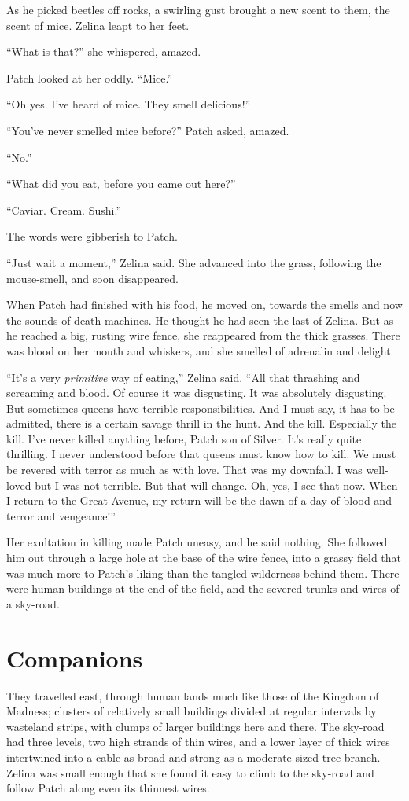 \documentclass[ebook,oneside,openany,17pt]{memoir}
\renewcommand{\thechapter}{\Roman{chapter}}
\newcounter{sections}
\newcommand{\sections}[1]{%
  \section*{#1}
  \addtocounter{sections}{1}%
  \pdfbookmark[1]{#1}{section.\thechapter.\thesections}}
\begin{document}
As he picked beetles off rocks, a swirling gust brought a new scent to
them, the scent of mice. Zelina leapt to her feet.

“What is that?” she whispered, amazed.

Patch looked at her oddly. “Mice.”

“Oh yes. I’ve heard of mice. They smell delicious!”

“You’ve never smelled mice before?” Patch asked, amazed.

“No.”

“What did you eat, before you came out here?”

“Caviar. Cream. Sushi.”

The words were gibberish to Patch.

“Just wait a moment,” Zelina said. She advanced into the grass,
following the mouse-smell, and soon disappeared.

When Patch had finished with his food, he moved on, towards the smells
and now the sounds of death machines. He thought he had seen the last
of Zelina. But as he reached a big, rusting wire fence, she reappeared
from the thick grasses. There was blood on her mouth and whiskers, and
she smelled of adrenalin and delight.

“It’s a very \emph{primitive} way of eating,” Zelina said. “All that
thrashing and screaming and blood. Of course it was disgusting. It was
absolutely disgusting. But sometimes queens have terrible
responsibilities. And I must say, it has to be admitted, there is a
certain savage thrill in the hunt. And the kill. Especially the
kill. I’ve never killed anything before, Patch son of Silver. It’s
really quite thrilling. I never understood before that queens must
know how to kill. We must be revered with terror as much as with
love. That was my downfall. I was well-loved but I was not
terrible. But that will change. Oh, yes, I see that now. When I return
to the Great Avenue, my return will be the dawn of a day of blood and
terror and vengeance!”

Her exultation in killing made Patch uneasy, and he said nothing. She
followed him out through a large hole at the base of the wire fence,
into a grassy field that was much more to Patch’s liking than the
tangled wilderness behind them. There were human buildings at the end
of the field, and the severed trunks and wires of a sky-road.


\sections{Companions}

They travelled east, through human lands much like those of the
Kingdom of Madness; clusters of relatively small buildings divided at
regular intervals by wasteland strips, with clumps of larger buildings
here and there. The sky-road had three levels, two high strands of
thin wires, and a lower layer of thick wires intertwined into a cable
as broad and strong as a moderate-sized tree branch. Zelina was small
enough that she found it easy to climb to the sky-road and follow
Patch along even its thinnest wires.
\end{document}
